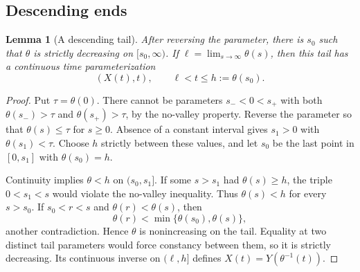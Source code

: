 \documentclass[11pt,reqno]{amsart}
\numberwithin{equation}{section}
\newtheorem{lemma}[theorem]{Lemma}
\theoremstyle{definition}
\theoremstyle{remark}
\begin{document}
\subsection{Descending ends}
\begin{lemma}[A descending tail]\label{lem:tail}
After reversing the parameter, there is $s_0$ such that $\theta$ is strictly decreasing on $[s_0,\infty)$. If $\ell=\lim_{s\to\infty}\theta(s)$, then this tail has a continuous time parameterization
\[
 (X(t),t),\qquad \ell<t\leq h:=\theta(s_0).
\]
\end{lemma}
\begin{proof}
Put $\tau=\theta(0)$. There cannot be parameters $s_-<0<s_+$ with both $\theta(s_-)>\tau$ and $\theta(s_+)>\tau$, by the no-valley property. Reverse the parameter so that $\theta(s)\leq\tau$ for $s\geq0$. Absence of a constant interval gives $s_1>0$ with $\theta(s_1)<\tau$. Choose $h$ strictly between these values, and let $s_0$ be the last point in $[0,s_1]$ with $\theta(s_0)=h$.

Continuity implies $\theta<h$ on $(s_0,s_1]$. If some $s>s_1$ had $\theta(s)\geq h$, the triple $0<s_1<s$ would violate the no-valley inequality. Thus $\theta(s)<h$ for every $s>s_0$. If $s_0<r<s$ and $\theta(r)<\theta(s)$, then
\[
 \theta(r)<\min\{\theta(s_0),\theta(s)\},
\]
another contradiction. Hence $\theta$ is nonincreasing on the tail. Equality at two distinct tail parameters would force constancy between them, so it is strictly decreasing. Its continuous inverse on $(\ell,h]$ defines $X(t)=Y(\theta^{-1}(t))$.
\end{proof}
\end{document}
